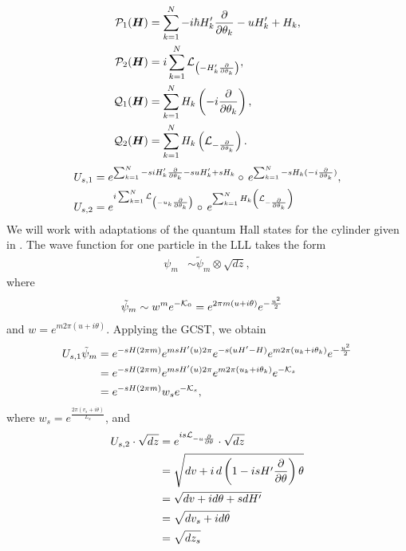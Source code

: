 \documentclass[notas.tex]{subfiles}
\begin{document}
\begin{align*}
	\mathcal{P}_1(\bm{H}) &= \sum_{k=1}^{N} - i \hbar H_k' \frac{\partial }{\partial \theta_k} - u H_k' + H_k, \\
	\mathcal{P}_2(\bm{H}) &= i \sum_{k=1}^{N} \mathcal{L}_{\left( - H_k' \frac{\partial }{\partial \theta_k} \right)}, \nonumber\\
	\mathcal{Q}_1(\bm{H}) &= \sum_{k=1}^{N} H_k \left (- i \frac{\partial }{\partial \theta_k} \right ), \nonumber \\
	\mathcal{Q}_2(\bm{H}) &= \sum_{k=1}^{N} H_k \left (\mathcal{L}_{-\frac{\partial }{\partial \theta_k}} \right ) . \nonumber
\end{align*}
\begin{align*}
	U_{s,1} &=  e^{ \sum_{k=1}^{N} -siH_k'\pd{\theta_k}-suH_k'+sH_k} \circ e^{ \sum_{k=1}^{N} -sH_k(-i  \pd{\theta_k})}, \\
	U_{s,2} &=  e^{i \sum_{k=1}^{N} \lied{\left( - u_k \pd{\theta_k} \right)}} \circ e^{ \sum_{k=1}^{N} H_k \left (\lied{-\pd{\theta_k}} \right )}
\end{align*}
We will work with adaptations of the quantum Hall states for the cylinder given in \cite{azuma_explicit_1994}. The wave function for one particle in the LLL takes the form
\begin{align*}
	\psi_{m} &\sim \tilde \psi_m \otimes \sqrt{dz},
\end{align*}
where
\begin{align*}
	\tilde \psi_{m} &\sim w^m e^{-\mathcal{K}_0} = e^{2 \pi m (u + i\theta)} e^{-\frac{u^2}{2}}
\end{align*}
and $w = e^{m 2\pi (u+i\theta)}$. Applying the GCST, we obtain
\begin{align}\label{eq_cyl_spf_evolution}
	U_{s,1} \tilde \psi_m &= e^{-s H \left (2 \pi m \right )}e^{ms H'(u) 2\pi}e^{-s(u H' - H)} e^{m 2\pi (u_k+i\theta_k)} e^{-\frac{u^2}{2}} \nonumber \\
	&= e^{-s H \left (2 \pi m \right )}e^{ms H'(u) 2\pi}e^{m 2\pi (u_k+i\theta_k)} e^{-\mathcal{K}_s} \\
	&= e^{-s H \left (2 \pi m \right )} w_s e^{-\mathcal{K}_s}, \nonumber
\end{align}
where $w_s = e^{\frac{2\pi \left (v_s + i \theta \right )}{L_x}}$, and
\begin{align*}
	U_{s,2} \cdot \sqrt{dz} &= e^{i s\mathcal{L}_{-u \frac{\partial }{\partial \theta}} } \cdot \sqrt{dz} \\
	&= \sqrt{dv + i \, d \left( 1 - i s H' \frac{\partial }{\partial \theta} \right)\theta}\\
	&= \sqrt{dv + i d \theta + s dH'} \\
	&= \sqrt{dv_{s} + i d \theta} \\
	&= \sqrt{dz_{s}}
\end{align*}
\end{document}
